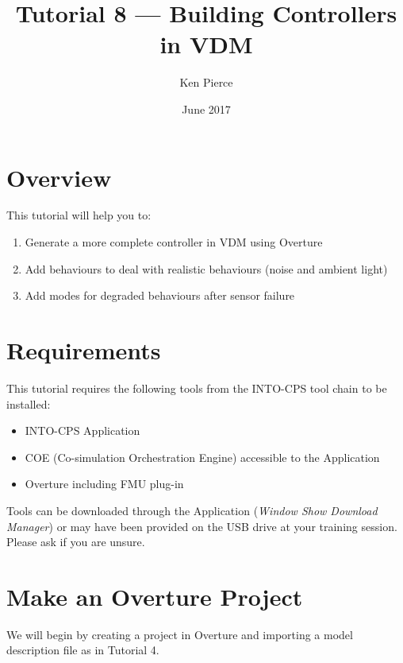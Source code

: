 \documentclass[11pt,a4paper]{../tutorial}
\title{Tutorial 8 --- Building Controllers in VDM}
\date{June 2017}
\author{Ken Pierce}
\begin{document}
\section*{Overview}

This tutorial will help you to:

\begin{enumerate}[noitemsep]
\item Generate a more complete controller in VDM using Overture
\item Add behaviours to deal with realistic behaviours (noise and ambient light)
\item Add modes for degraded behaviours after sensor failure
\end{enumerate}

\section*{Requirements}

This tutorial requires the following tools from the INTO-CPS tool chain to be installed:

\begin{itemize}[noitemsep]
\item INTO-CPS Application
\item COE (Co-simulation Orchestration Engine) accessible to the Application
\item Overture including FMU plug-in
\end{itemize}

Tools can be downloaded through the Application (\emph{Window \menusep Show Download Manager}) or may have been provided on the USB drive at your training session. Please ask if you are unsure.

\section{Make an Overture Project}

We will begin by creating a project in Overture and importing a model description file as in Tutorial 4.
\end{document}
